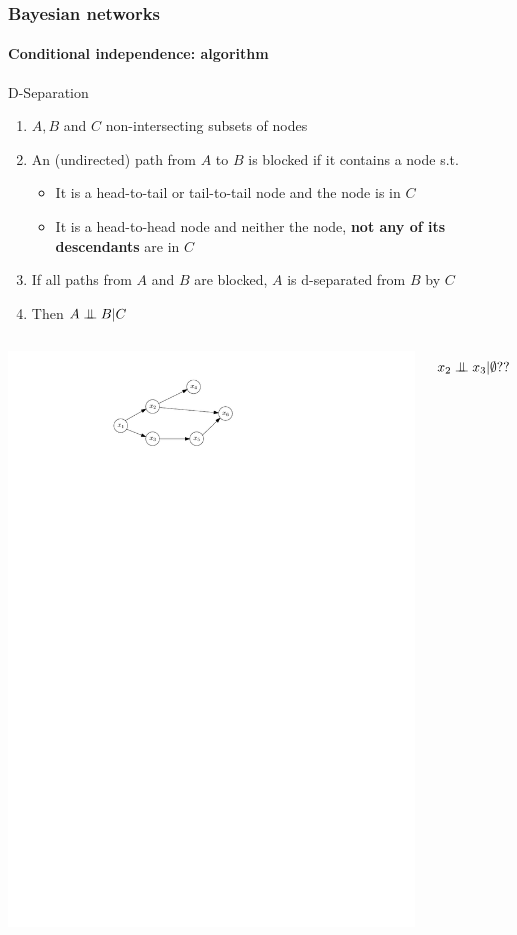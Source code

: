 \documentclass[slidestop,compress,mathserif]{beamer}
\newcommand{\indep}{\ensuremath{\perp\mkern -10mu \perp}}
\begin{document}
\begin{frame}	\frametitle{Bayesian networks}
	\framesubtitle{Conditional independence: algorithm}
    \vspace{-.5cm}
    \begin{block}{D-Separation}
    \begin{enumerate}
    \item $A,B$ and $C$ non-intersecting subsets of nodes
    \item An (undirected) path from $A$ to $B$ is blocked if it contains
    a node s.t.
    \begin{itemize}
    \item It is a head-to-tail or tail-to-tail node and
    the node is in $C$
    \item It is a head-to-head node and neither the node,
    \textbf{not any of its descendants} are in $C$
    \end{itemize}
    \item If all paths from $A$ and $B$ are blocked,
    $A$ is d-separated from $B$ by $C$
    \item Then $A \indep B | C$
    \end{enumerate}
    \end{block}
      \begin{columns}
    \column[c]{6cm}
    \begin{center}
    \includegraphics[width=.7\textwidth]{dsep0}
    \end{center}    
    \column[c]{6cm}
    $$x_2\indep x_3|\emptyset ??$$
    \end{columns}
   
\end{frame}
\end{document}
